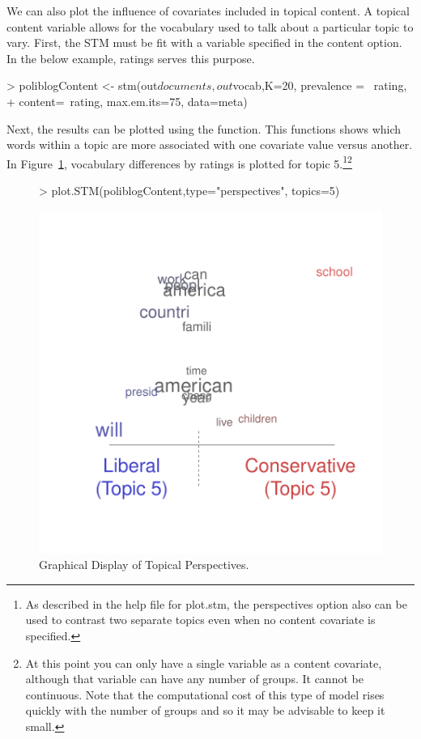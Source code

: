 \documentclass[nojss]{jss}
\begin{document}
We can also plot the influence of covariates included in topical content. A topical content variable allows for the vocabulary used to talk about a particular topic to vary. First, the STM must be fit with a variable specified in the content option. In the below example, ratings serves this purpose.

\begin{Schunk}
\begin{Sinput}
> poliblogContent <- stm(out$documents,out$vocab,K=20, prevalence =~ rating,
+         content=~rating, max.em.its=75, data=meta)
\end{Sinput}
\end{Schunk}

Next, the results can be plotted using the  function.  This functions shows which words within a topic are more associated with one covariate value versus another. In Figure~\ref{fig:perp}, vocabulary differences by ratings is plotted for topic 5.\footnote{As described in the help file for plot.stm, the perspectives option also can be used to contrast two separate topics even when no content covariate is specified.}\footnote{At this point you can only
 have a single variable as a content covariate, although that variable can have any number of groups. It cannot be continuous. Note that the computational cost of this type of model rises quickly with the number of groups and so it may be advisable to keep it small.}

\begin{figure}[t!]
\begin{center}
\begin{Schunk}
\begin{Sinput}
> plot.STM(poliblogContent,type="perspectives", topics=5)
\end{Sinput}
\end{Schunk}
\includegraphics{stmVignette-016}
\caption{Graphical Display of Topical Perspectives.}
\label{fig:perp}
\end{center}
\end{figure}
\end{document}
